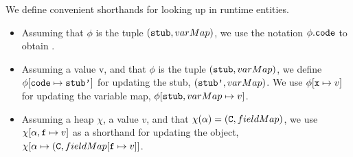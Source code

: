 \begin{definition}
We define convenient shorthands for looking up in  runtime entities. 
\begin{itemize}
\item
Assuming that $\phi$ is the tuple  $({\mbox{\tt{stub}}}, varMap)$, we use the notation  $\phi.{\mbox{\tt{code}}}$ to obtain .
\item
Assuming a value v, and that $\phi$ is the tuple  $({\mbox{\tt{stub}}}, varMap)$, we define $\phi[{\mbox{\tt{code}}}\mapsto{\mbox{\tt{stub'}}}]$ for updating the stub, \ie   
$({\mbox{\tt{stub'}}}, varMap)$.   We use  $\phi[{\mbox{\tt{x}}} \mapsto v]$  for updating the variable map, \ie  $\phi[{\mbox{\tt{stub}}}, varMap\mapsto v]$.
\item
Assuming a heap $\chi$, a value $v$, and   that $\chi(\alpha)=({\mbox{\tt{C}}}, fieldMap)$,
we use $\chi[\alpha,{\mbox{\tt{f}}} \mapsto v]$ as a shorthand for updating the object, \ie $\chi[\alpha \mapsto ({\mbox{\tt{C}}}, fieldMap[{\mbox{\tt{f}}} \mapsto v]]$.
\end{itemize}

\end{definition}






